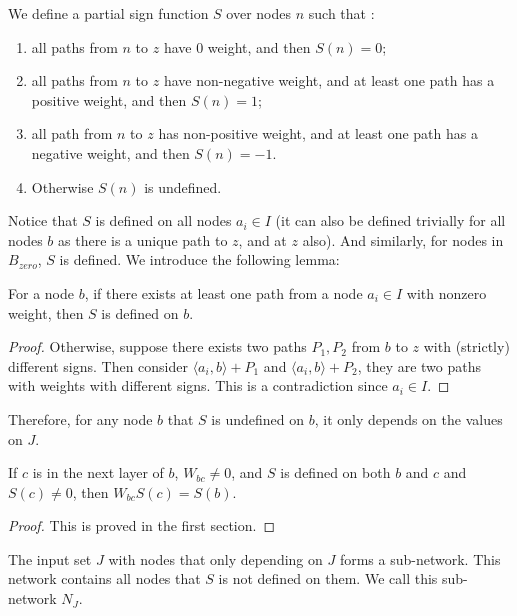				
				\begin{definition}\label{sign_of_nodes_in_I_2}
					We define a partial sign function $S$ over nodes $n$ such that : 	
					\begin{enumerate} 
						\item all paths from $n$ to $z$ have 0 weight, and then $S(n)=0$; 
						\item all paths from $n$ to $z$ have non-negative weight, and at least one path has a positive weight, and then $S(n)=1$; 
						\item all path from $n$ to $z$ has non-positive weight, and at least one path has a negative weight, and then $S(n)=-1$.
						\item Otherwise $S(n)$ is undefined.
					\end{enumerate}
				\end{definition}	
				
				Notice that $S$ is defined on all nodes $a_i \in I$ (it can also be defined trivially for all nodes $b$ as there is a unique path to $z$, and at $z$ also). And similarly, for nodes in  $B_{zero}$, $S$ is defined. We introduce the following lemma:
				
				\begin{lemma}\label{lem:sign}
					For a node $b$, if there exists at least one path from a node $a_i\in I$ with nonzero weight, then  $S$ is defined on $b$.
				\end{lemma}
				
				\begin{proof}
					Otherwise, suppose there exists two paths $P_1,P_2$ from $b$ to $z$ with (strictly) different signs. Then consider $\langle a_i,b\rangle+P_1$ and $\langle a_i,b\rangle+P_2$, they are two paths with weights with different signs. This is a contradiction since $a_i\in I$.
				\end{proof}
				Therefore, for any node $b$  that $S$ is undefined on $b$, it only depends on the values on $J$.  
				
				\begin{lemma}
					If $c$ is in the next layer of $b$, $W_{bc}\neq 0$, and $S$ is defined on both $b$ and $c$ and $S(c)\neq 0$, then $W_{bc}S(c)=S(b)$.
				\end{lemma}
				
				\begin{proof}
					This is proved in the first section.
				\end{proof}
				
				\begin{lemma}\label{lem:subnetwork2}
					The input set $J$ with nodes that only depending on $J$ forms a sub-network. This network contains all nodes that $S$ is not defined on them. We call this sub-network $N_J$.
				\end{lemma}
				
